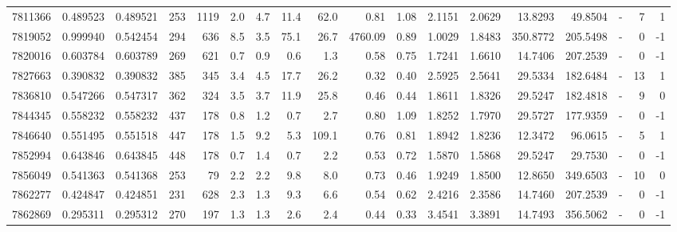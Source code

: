 \begin{tabular}{rrrrrrrrrrrrrrrlrr}
   7811366 & 0.489523 &   0.489521 &  253 & 1119 &      2.0 &      4.7 &    11.4 &     62.0 &       0.81 &        1.08 &  2.1151 &  2.0629 &   13.8293 &   49.8504 &             - &        7 &          1 \\
   7819052 & 0.999940 &   0.542454 &  294 &  636 &      8.5 &      3.5 &    75.1 &     26.7 &    4760.09 &        0.89 &  1.0029 &  1.8483 &  350.8772 &  205.5498 &             - &        0 &         -1 \\
   7820016 & 0.603784 &   0.603789 &  269 &  621 &      0.7 &      0.9 &     0.6 &      1.3 &       0.58 &        0.75 &  1.7241 &  1.6610 &   14.7406 &  207.2539 &             - &        0 &         -1 \\
   7827663 & 0.390832 &   0.390832 &  385 &  345 &      3.4 &      4.5 &    17.7 &     26.2 &       0.32 &        0.40 &  2.5925 &  2.5641 &   29.5334 &  182.6484 &             - &       13 &          1 \\
   7836810 & 0.547266 &   0.547317 &  362 &  324 &      3.5 &      3.7 &    11.9 &     25.8 &       0.46 &        0.44 &  1.8611 &  1.8326 &   29.5247 &  182.4818 &             - &        9 &          0 \\
   7844345 & 0.558232 &   0.558232 &  437 &  178 &      0.8 &      1.2 &     0.7 &      2.7 &       0.80 &        1.09 &  1.8252 &  1.7970 &   29.5727 &  177.9359 &             - &        0 &         -1 \\
   7846640 & 0.551495 &   0.551518 &  447 &  178 &      1.5 &      9.2 &     5.3 &    109.1 &       0.76 &        0.81 &  1.8942 &  1.8236 &   12.3472 &   96.0615 &             - &        5 &          1 \\
   7852994 & 0.643846 &   0.643845 &  448 &  178 &      0.7 &      1.4 &     0.7 &      2.2 &       0.53 &        0.72 &  1.5870 &  1.5868 &   29.5247 &   29.7530 &             - &        0 &         -1 \\
   7856049 & 0.541363 &   0.541368 &  253 &   79 &      2.2 &      2.2 &     9.8 &      8.0 &       0.73 &        0.46 &  1.9249 &  1.8500 &   12.8650 &  349.6503 &             - &       10 &          0 \\
   7862277 & 0.424847 &   0.424851 &  231 &  628 &      2.3 &      1.3 &     9.3 &      6.6 &       0.54 &        0.62 &  2.4216 &  2.3586 &   14.7460 &  207.2539 &             - &        0 &         -1 \\
   7862869 & 0.295311 &   0.295312 &  270 &  197 &      1.3 &      1.3 &     2.6 &      2.4 &       0.44 &        0.33 &  3.4541 &  3.3891 &   14.7493 &  356.5062 &             - &        0 &         -1 \\

\end{tabular}
